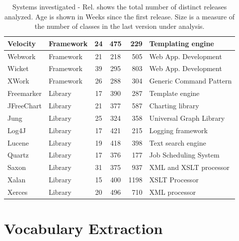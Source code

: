 \begin{table}[!]
\begin{tabular}{|l|l||c|c|r|p{}|}
\hline
Velocity&Framework&24 & 475 & 229 & Templating engine\\
\hline
Webwork&Framework&21 & 218 & 505 & Web App. Development\\
\hline
Wicket&Framework&39 & 295 & 803 & Web App. Development\\
\hline
XWork&Framework&26 & 288 & 304 & Generic Command Pattern\\
\hline
Freemarker&Library&17 & 390 & 287 & Template engine\\
\hline
JFreeChart&Library&21 & 377 & 587 & Charting library\\
\hline
Jung&Library&25 & 324 & 358 & Universal Graph Library\\
\hline
Log4J&Library&17 & 421 & 215 & Logging framework\\
\hline
Lucene&Library&19 & 418 & 398 & Text search engine\\
\hline
Quartz&Library&17 & 376 & 177 & Job Scheduling System\\
\hline
Saxon&Library&31 & 375 & 937 & XML and XSLT processor\\
\hline
Xalan&Library&15 & 400 & 1198 & XSLT Processor\\
\hline
Xerces&Library&20 & 496 & 710 & XML processor\\
\hline
\end{tabular}
\caption{Systems investigated - Rel. shows the total number of distinct releases analyzed. Age is shown in Weeks since the first release. Size is a measure of the number of classes in the last version under analysis.}
\label{tab:systems}
\end{table}



\section{Vocabulary Extraction} %
\label{sec:vocabulary_extraction}




